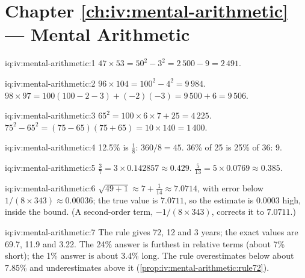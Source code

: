 \section*{Chapter \ref{ch:iv:mental-arithmetic} --- Mental Arithmetic}

\begin{solution}{iq:iv:mental-arithmetic:1}
$47 \times 53 = 50^2 - 3^2 = 2\,500 - 9 = 2\,491$.
\end{solution}

\begin{solution}{iq:iv:mental-arithmetic:2}
$96 \times 104 = 100^2 - 4^2 = 9\,984$. $98 \times 97 = 100(100 - 2 - 3) + (-2)(-3) = 9\,500 + 6 = 9\,506$.
\end{solution}

\begin{solution}{iq:iv:mental-arithmetic:3}
$65^2 = 100 \times 6 \times 7 + 25 = 4\,225$. $75^2 - 65^2 = (75 - 65)(75 + 65) = 10 \times 140 = 1\,400$.
\end{solution}

\begin{solution}{iq:iv:mental-arithmetic:4}
12.5\% is $\tfrac18$: $360/8 = 45$. 36\% of 25 is 25\% of 36: 9.
\end{solution}

\begin{solution}{iq:iv:mental-arithmetic:5}
$\tfrac37 = 3 \times 0.142857 \approx 0.429$. $\tfrac5{13} = 5 \times 0.0769 \approx 0.385$.
\end{solution}

\begin{solution}{iq:iv:mental-arithmetic:6}
$\sqrt{49 + 1} \approx 7 + \tfrac1{14} \approx 7.0714$, with error below $1/(8 \times 343) \approx 0.00036$; the
true value is $7.0711$, so the estimate is $0.0003$ high, inside the bound. (A second-order term, $-1/(8 \times
343)$, corrects it to $7.0711$.)
\end{solution}

\begin{solution}{iq:iv:mental-arithmetic:7}
The rule gives 72, 12 and 3 years; the exact values are 69.7, 11.9 and 3.22. The 24\% answer is furthest in
relative terms (about 7\% short); the 1\% answer is about 3.4\% long. The rule overestimates below about 7.85\%
and underestimates above it (\cref{prop:iv:mental-arithmetic:rule72}).
\end{solution}

